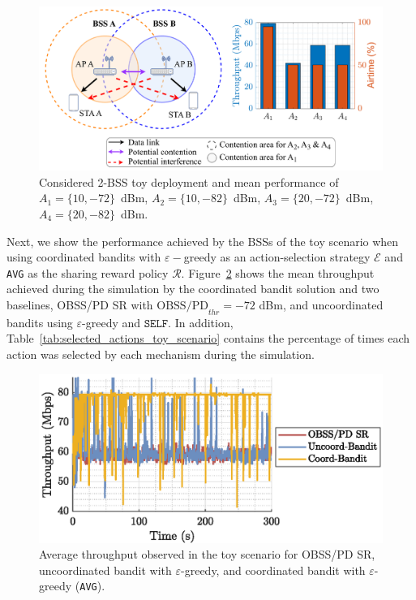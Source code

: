 \begin{figure}[ht!]
    \centering
    \includegraphics[width=\linewidth]{figures/toy_scenario.pdf}
    \caption{Considered 2-BSS toy deployment and mean performance of $A_1=\{10,-72\}$~dBm, $A_2=\{10,-82\}$~dBm, $A_3=\{20,-72\}$~dBm, $A_4=\{20,-82\}$~dBm.}
    \label{fig:toy_scenario}
\end{figure}

Next, we show the performance achieved by the BSSs of the toy scenario when using coordinated bandits with $\varepsilon-$greedy as an action-selection strategy $\mathcal{E}$ and \texttt{AVG} as the sharing reward policy $\mathcal{R}$. Figure~\ref{fig:bandits_performance_toy_scenario} shows the mean throughput achieved during the simulation by the coordinated bandit solution and two baselines, OBSS/PD SR with $\text{OBSS/PD}_{thr} = -72$ dBm, and uncoordinated bandits using $\varepsilon$-greedy and $\texttt{SELF}$. In addition, Table~\ref{tab:selected_actions_toy_scenario} contains the percentage of times each action was selected by each mechanism during the simulation.

\begin{figure}[ht!]
\centering
\includegraphics[width=\columnwidth]{figures/dcf_vs_egreedy_new.eps}
\caption{Average throughput observed in the toy scenario for OBSS/PD SR, uncoordinated bandit with $\varepsilon$-greedy, and coordinated bandit with $\varepsilon$-greedy (\texttt{AVG}).}
\label{fig:bandits_performance_toy_scenario}
\end{figure}

